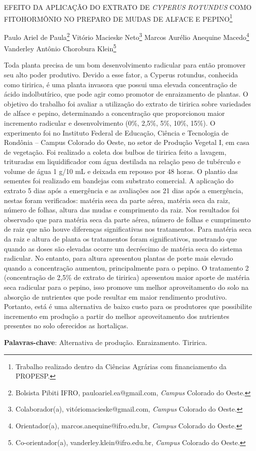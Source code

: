 \documentclass[article,12pt,onesidea,4paper,english,brazil]{abntex2}
\begin{document}
	
	
	\frenchspacing 
	
	\begin{center}
		\LARGE EFEITO DA APLICAÇÃO DO EXTRATO DE \textit{CYPERUS ROTUNDUS} COMO
		FITOHORMÔNIO NO PREPARO DE MUDAS DE ALFACE E PEPINO\footnote{Trabalho realizado dentro da Ciências Agrárias com financiamento da PROPESP.}
		
		\normalsize
		Paulo Ariel de Paula\footnote{Bolsista Pibiti IFRO, pauloariel.ea@gmail.com, \textit{Campus} Colorado do Oeste.} 
		Vitório Macieske Neto\footnote{Colaborador(a), vitóriomacieske@gmail.com, \textit{Campus} Colorado do Oeste.} 
		Marcos Aurélio Anequine Macedo\footnote{Orientador(a), marcos.anequine@ifro.edu.br, \textit{Campus} Colorado do Oeste.} 
		Vanderley Antônio Chorobura Klein\footnote{Co-orientador(a), vanderley.klein@ifro.edu.br, \textit{Campus} Colorado do Oeste.} 
	\end{center}
	
	\noindent Toda planta precisa de um bom desenvolvimento radicular para então promover seu
	alto poder produtivo. Devido a esse fator, a Cyperus rotundus, conhecida como
	tiririca, é uma planta invasora que possui uma elevada concentração de ácido
	indolbutírico, que pode agir como promotor de enraizamento de plantas. O objetivo
	do trabalho foi avaliar a utilização do extrato de tiririca sobre variedades de alface e
	pepino, determinando a concentração que proporcionou maior incremento radicular
	e desenvolvimento (0\%, 2,5\%, 5\%, 10\%, 15\%). O experimento foi no Instituto
	Federal de Educação, Ciência e Tecnologia de Rondônia – Campus Colorado do
	Oeste, no setor de Produção Vegetal I, em casa de vegetação. Foi realizado a coleta
	dos bulbos de tiririca feito a lavagem, trituradas em liquidificador com água destilada
	na relação peso de tubérculo e volume de água 1 g/10 mL e deixada em repouso por
	48 horas. O plantio das sementes foi realizado em bandejas com substrato
	comercial. A aplicação do extrato 5 dias após a emergência e as avaliações aos 21
	dias após a emergência, nestas foram verificados: matéria seca da parte aérea,
	matéria seca da raiz, número de folhas, altura das mudas e comprimento da raiz.
	Nos resultados foi observado que para matéria seca da parte aérea, número de
	folhas e cumprimento de raiz que não houve diferenças significativas nos
	tratamentos. Para matéria seca da raiz e altura de planta os tratamentos foram
	significativos, mostrando que quando as doses são elevadas ocorre um decréscimo
	de matéria seca do sistema radicular. No entanto, para altura apresentou plantas de
	porte mais elevado quando a concentração aumentou, principalmente para o pepino.
	O tratamento 2 (concentração de 2,5\% de extrato de tiririca) apresentou maior
	aporte de matéria seca radicular para o pepino, isso promove um melhor
	aproveitamento do solo na absorção de nutrientes que pode resultar em maior
	rendimento produtivo. Portanto, está é uma alternativa de baixo custo para os
	produtores que possibilite incremento em produção a partir do melhor
	aproveitamento dos nutrientes presentes no solo oferecidos as hortaliças.
	
	\vspace{\onelineskip}
	
	\noindent
	\textbf{Palavras-chave}: Alternativa de produção. Enraizamento. Tiririca.
	
\end{document}
